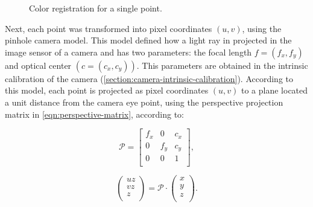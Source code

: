 \begin{figure}

    \caption{Color registration for a single point.}
    \label{fig:color-registration-3d}
\end{figure}

Next, each point was transformed into pixel coordinates $(u, v)$, using the pinhole camera model. This model defined how a light ray in projected in the image sensor of a camera and has two parameters: the focal length $f = (f_x, f_y)$ and optical center $(c = (c_x, c_y))$. This parameters are obtained in the intrinsic calibration of the camera (\cref{section:camera-intrinsic-calibration}). According to this model, each point is projected as pixel coordinates $(u, v)$ to a plane located a unit distance from the camera eye point, using the perspective projection matrix in \cref{eqn:perspective-matrix}, according to:

\begin{equation}
    \label{eqn:perspective-matrix}
    \mathcal{P} =
    \left[
        \begin{array}{ccc}
            f_x & 0   & c_x \\
            0   & f_y & c_y \\
            0   & 0   & 1   \\
        \end{array}    
    \right],
\end{equation}

\begin{equation}
    \label{eqn:perpective-transformation}
    \left(
        \begin{array}{c}
            u z \\ v z \\ z \\
        \end{array}    
    \right)
    =
    \mathcal{P} \cdot
    \left(
        \begin{array}{c}
            x \\ y \\ z \\
        \end{array}    
    \right).
\end{equation}

